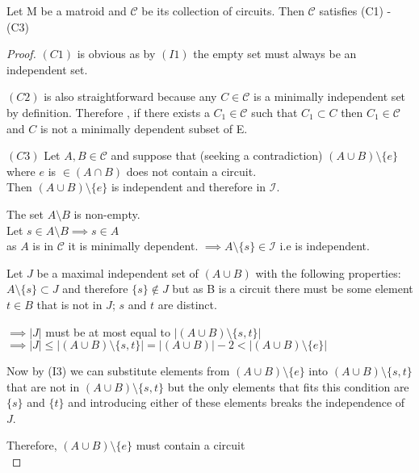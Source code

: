 \documentclass[../main.tex]{subfiles}
\begin{document}
 \begin{thm}
 Let M be a matroid and $\mathcal{C}$ be its collection of circuits. Then $\mathcal{C}$ satisfies (C1) - (C3)
  \end{thm}
\begin{proof}
\noindent $(C1)$ is obvious as by $(I1)$ the empty set must always be an independent set.
 
\noindent $(C2)$ is also straightforward because any $ C \in \mathcal{C} $ is a minimally independent set by definition. Therefore , if there exists a $ C_1 \in \mathcal{C} $ such that $ C_1 \subset C $ then $ C_1 \in \mathcal{C} $ and $ C $ is not a minimally dependent subset of E. 
 
 \vspace{2mm}
 
 \noindent $(C3)$ Let $ A, B \in \mathcal{C} $ and suppose that (seeking a contradiction) $ (A \cup B) \setminus \{e\} $ where $ e $ is $ \in (A \cap B) $ does not contain a circuit.\\
 \noindent Then $ (A \cup B) \setminus \{e\} $ is independent and therefore in $\mathcal{I}.$
 
 \vspace{2mm}
 
\noindent The set $ A \setminus B $ is non-empty.\\
 Let $ s \in A \setminus B    \implies s \in A$\\
 \noindent as $A$ is in $\mathcal{C}$ it is minimally dependent.
 \noindent $\implies A \setminus \{s\} \in \mathcal{I}$ i.e is independent.
 
 \vspace{2mm}
 
\noindent Let $J$ be a maximal independent set of $(A \cup B)$ with the following properties: $A \setminus \{s\} \subset J $ and therefore $ \{s\} \notin J $ but as B is a circuit there must be some element $t \in B$ that is not in $J$; $s$ and $t$ are distinct.
 
 \vspace{2mm}
 
\noindent $\implies |J| $ must be at most equal to $|(A \cup B) \setminus \{s,t\}| $\\
 $\implies |J| \leq |(A \cup B) \setminus \{s,t\}| = |(A \cup B)| - 2 < |(A \cup B) \setminus \{e\}|$
 
 \vspace{2mm} 
 
 \noindent Now by (I3) we can substitute elements from $(A \cup B) \setminus \{e\}$ into $(A \cup B) \setminus \{s,t\}$ that are not in $(A \cup B) \setminus \{s,t\}$ but the only elements that fits this condition are $\{s\}$ and $\{t\}$ and introducing either of these elements breaks the independence of $J$.
 
\noindent Therefore, $(A \cup B) \setminus \{e\}$ must contain a circuit\\
 \end{proof}
 
\end{document}
